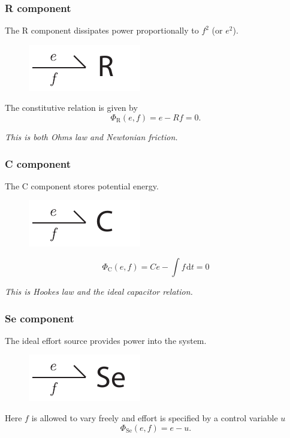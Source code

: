 \documentclass[11pt,reqno]{beamer}
\newcommand{\df}[1]{\mspace{2mu}  \mathrm{d}#1}
\begin{document}
\begin{frame}
\frametitle{R component}
The R component dissipates power proportionally to $f^2$ (or $e^2$).
\begin{figure}
	\includegraphics{oneport-R.pdf}
\end{figure}
The constitutive relation is given by
\[
\Phi_\text{R}(e,f) = e - Rf = 0.
\]
\vspace{10pt}

\begin{center}
\emph{This is both Ohms law and Newtonian friction.}
\end{center}
\end{frame}
\begin{frame}
\frametitle{C component}
The C component stores potential energy.
\begin{figure}
	\includegraphics{oneport-C.pdf}
\end{figure}
\[
\Phi_\text{C}(e,f) = Ce - \int f \df{t} = 0
\]
\vspace{10pt}

\begin{center}
\emph{This is Hookes law and the ideal capacitor relation.}
\end{center}
\end{frame}
\begin{frame}
\frametitle{Se component}
The ideal effort source provides power into the system.
\begin{figure}
\includegraphics{oneport-Se.pdf}
\end{figure}
Here $f$ is allowed to vary freely and effort is specified by a control variable $u$
\[
\Phi_\text{Se}(e,f) = e - u.
\]

\end{frame}
\end{document}

